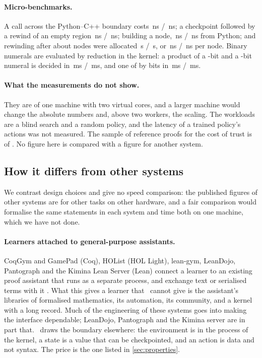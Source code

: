 \paragraph{Micro-benchmarks.}
A call across the Python--C++ boundary costs \ffiNsA\,ns / \ffiNsB\,ns; a checkpoint followed by a rewind of an empty region \rewPairNsA\,ns / \rewPairNsB\,ns; building a node, \nodeBuildNsA\,ns / \nodeBuildNsB\,ns from Python; and rewinding after about \rewNodes{} nodes were allocated \rewindUsA\,\textmu s / \rewindUsB\,\textmu s, or \rewindNsNodeA\,ns / \rewindNsNodeB\,ns per node.
Binary numerals are evaluated by reduction in the kernel: a product of a \prodSmallBitsA-bit and a \prodSmallBitsB-bit numeral is decided in \prodSmallMsA\,ms / \prodSmallMsB\,ms, and one of \prodLargeBitsA{} by \prodLargeBitsB{} bits in \prodLargeMsA\,ms / \prodLargeMsB\,ms.

\paragraph{What the measurements do not show.}
They are of one machine with two virtual cores, and a larger machine would change the absolute numbers and, above two workers, the scaling.
The workloads are a blind search and a random policy, and the latency of a trained policy's actions was not measured.
The sample of reference proofs for the cost of trust is \chkSampled{} of \proofsProved{}.
No figure here is compared with a figure for another system.

\subsection{How it differs from other systems}\label{sec:related}

We contrast design choices and give no speed comparison: the published figures of other systems are for other tasks on other hardware, and a fair comparison would formalise the same statements in each system and time both on one machine, which we have not done.

\paragraph{Learners attached to general-purpose assistants.}
CoqGym and GamePad (Coq), HOList (HOL Light), lean-gym, LeanDojo, Pantograph and the Kimina Lean Server (Lean) connect a learner to an existing proof assistant that runs as a separate process, and exchange text or serialised terms with it \citep{yang19,huang19,bansal19,leangym,yang23,aniva24,dossantos25}.
What this gives a learner that \ITP\ cannot give is the assistant's libraries of formalised mathematics, its automation, its community, and a kernel with a long record.
Much of the engineering of these systems goes into making the interface dependable; LeanDojo, Pantograph and the Kimina server are in part that.
\ITP\ draws the boundary elsewhere: the environment is in the process of the kernel, a state is a value that can be checkpointed, and an action is data and not syntax.
The price is the one listed in \cref{sec:properties}.

